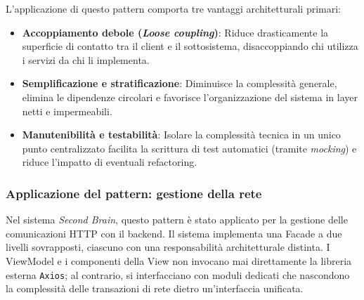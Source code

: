 \documentclass[11pt,a4paper]{article}
\begin{document}
L'applicazione di questo pattern comporta tre vantaggi architetturali primari:
\begin{itemize}
    \item \textbf{Accoppiamento debole (\textit{Loose coupling})}: Riduce drasticamente la superficie di contatto tra il client e il sottosistema, disaccoppiando chi utilizza i servizi da chi li implementa.
    \item \textbf{Semplificazione e stratificazione}: Diminuisce la complessità generale, elimina le dipendenze circolari e favorisce l'organizzazione del sistema in layer netti e impermeabili.
    \item \textbf{Manutenibilità e testabilità}: Isolare la complessità tecnica in un unico punto centralizzato facilita la scrittura di test automatici (tramite \textit{mocking}) e riduce l'impatto di eventuali refactoring.
\end{itemize}

\subsubsection{Applicazione del pattern: gestione della rete}
Nel sistema \textit{Second Brain}, questo pattern è stato applicato per la gestione delle comunicazioni HTTP con il backend. Il sistema implementa una Facade a due livelli sovrapposti, ciascuno con una responsabilità architetturale distinta. I ViewModel e i componenti della View non invocano mai direttamente la libreria esterna \texttt{Axios}; al contrario, si interfacciano con moduli dedicati che nascondono la complessità delle transazioni di rete dietro un'interfaccia unificata.
\end{document}
